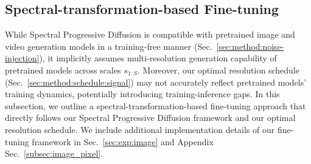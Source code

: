



\subsection{Spectral-transformation-based Fine-tuning}
\label{sec:method:lora}
While Spectral Progressive Diffusion is compatible with pretrained image and video generation models in a training-free manner (Sec.~\ref{sec:method:noise-injection}), it implicitly assumes multi-resolution generation capability of pretrained models across scales $s_{1:S}$. Moreover, our optimal resolution schedule (Sec.~\ref{sec:method:schedule:signal}) may not accurately reflect pretrained models' training dynamics, potentially introducing training-inference gaps. 
In this subsection, we outline a spectral-transformation-based fine-tuning approach that directly follows our Spectral Progressive Diffusion framework and our optimal resolution schedule. We include additional implementation details of our fine-tuning framework in Sec.~\ref{sec:exp:image} and Appendix Sec.~\ref{subsec:image_pixel}.

